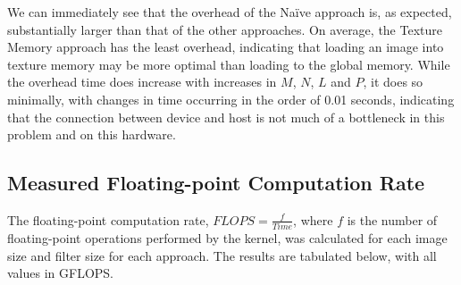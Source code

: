 \documentclass[10pt]{article}
\begin{document}
We can immediately see that the overhead of the Na\"{i}ve approach is, as expected, substantially larger than that of the other approaches. On average, the Texture Memory approach has the least overhead, indicating that loading an image into texture memory may be more optimal than loading to the global memory. While the overhead time does increase with increases in $M$, $N$, $L$ and $P$, it does so minimally, with changes in time occurring in the order of 0.01 seconds, indicating that the connection between device and host is not much of a bottleneck in this problem and on this hardware.
\subsection{Measured Floating-point Computation Rate}
The floating-point computation rate, $FLOPS = \frac{f}{Time}$, where $f$ is the number of floating-point operations performed by the kernel, was calculated for each image size and filter size for each approach. The results are tabulated below, with all values in GFLOPS.
\end{document}
